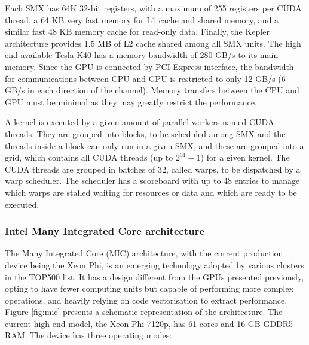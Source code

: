 Each SMX has 64K 32-bit registers, with a maximum of 255 registers per CUDA thread, a 64 KB very fast memory for L1 cache and shared memory, and a similar fast 48 KB memory cache for read-only data. Finally, the Kepler architecture provides 1.5 MB of L2 cache shared among all SMX units. The high end available Tesla K40 has a memory bandwidth of 280 GB/s to its main memory. Since the GPU is connected by PCI-Express interface, the bandwidth for communications between CPU and GPU is restricted to only 12 GB/s (6 GB/s in each direction of the channel). Memory transfers between the CPU and GPU must be minimal as they may greatly restrict the performance.

A kernel is executed by a given amount of parallel workers named CUDA threads. They are grouped into blocks, to be scheduled among SMX and the threads inside a block can only run in a given SMX, and these are grouped into a grid, which contains all CUDA threads (up to $2^{31}-1$) for a given kernel. The CUDA threads are grouped in batches of 32, called warps, to be dispatched by a warp scheduler. The scheduler has a scoreboard with up to 48 entries to manage which warps are stalled waiting for resources or data and which are ready to be executed.

\subsubsection*{Intel Many Integrated Core architecture}
\label{mic}

The \intel Many Integrated Core (MIC) architecture, with the current production device being the \intel Xeon Phi, is an emerging technology adopted by various clusters in the TOP500 list. It has a design different from the \nvidia GPUs presented previously, opting to have fewer computing units but capable of performing more complex operations, and heavily relying on code vectorisation to extract performance. Figure \ref{fig:mic} presents a schematic representation of the architecture. The current high end model, the \intel Xeon Phi 7120p, has 61 cores and 16 GB GDDR5 RAM. The device has three operating modes:


